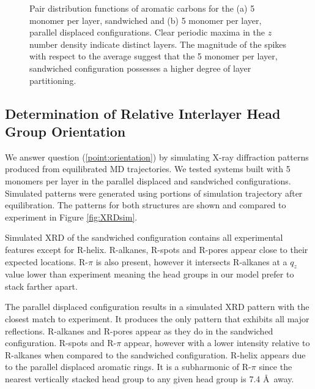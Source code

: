 \documentclass{article}
\begin{document}
\begin{figure}
\begin{subfigure}{0.45\textwidth}
                \caption{}\label{fig:zdf_offset}
        \end{subfigure}
        \caption{Pair distribution functions of aromatic carbons for the
        (a) 5 monomer per layer, sandwiched and (b) 5 monomer per layer,
        parallel displaced configurations. Clear periodic maxima in the
        $z$ number density indicate distinct layers. The magnitude
        of the spikes with respect to the average suggest that the 5
        monomer per layer, sandwiched configuration possesses a higher
        degree of layer partitioning.}\label{fig:zdf}
  \end{figure}

  \subsection{Determination of Relative Interlayer Head Group Orientation}

  We answer question (\ref{point:orientation}) by simulating X-ray diffraction
  patterns produced from equilibrated MD trajectories. We tested systems built
  with 5 monomers per layer in the parallel displaced and sandwiched
  configurations. Simulated patterns were generated using portions of simulation
  trajectory after equilibration. The patterns for both structures are shown and
  compared to experiment in Figure \ref{fig:XRDsim}.

  Simulated XRD of the sandwiched configuration contains all experimental
  features except for R-helix. R-alkanes, R-spots and R-pores appear close to their
  expected locations. R-$\pi$ is also present, however it intersects R-alkanes at
  a $q_z$ value lower than experiment meaning the head groups in our model prefer 
  to stack farther apart. 

  The parallel displaced configuration results in a simulated XRD pattern with
  the closest match to experiment. It produces the only pattern that exhibits all
  major reflections. R-alkanes and R-pores appear as they do in the sandwiched
  configuration. R-spots and R-$\pi$ appear, however with a lower intensity
  relative to R-alkanes when compared to the sandwiched configuration. R-helix
  appears due to the parallel displaced aromatic rings. It is a subharmonic of
  R-$\pi$ since the nearest vertically stacked head group to any given head group
  is 7.4 \AA~away. 
\end{document}
